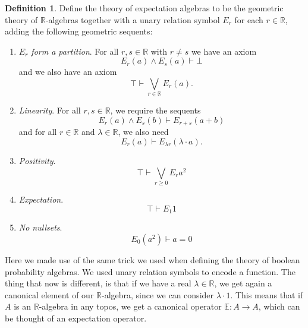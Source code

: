 \documentclass[a4paper]{amsproc}
\theoremstyle{plain}
\theoremstyle{definition}
\newtheorem{definition}[theorem]{Definition}
\theoremstyle{remark}
\numberwithin{equation}{section}
\newcommand{\Prob}{\mathfrak{Prob}}
\begin{document}
\begin{definition}
    Define the theory of expectation algebras to be the geometric theory of $\mathbb{R}$-algebras together with a unary relation symbol $E_r$ for each $r \in \mathbb{R}$, adding the following geometric sequents:
    \begin{enumerate}
        \item \textit{$E_r$ form a partition}. For all $r, s \in \mathbb{R}$ with $r \neq s$ we have an axiom
        \[
        E_r(a)  \wedge E_s(a) \vdash \bot
        \]
        and we also have an axiom
        \[
        \top \vdash \bigvee_{r \in \mathbb{R}} E_r(a).
        \]
        \item \textit{Linearity}. For all $r, s \in \mathbb{R}$, we require the sequents
        \[
        E_r(a) \wedge E_s(b) \vdash E_{r+s}(a + b)
        \]
        and for all $r \in \mathbb{R}$ and $\lambda \in \mathbb{R}$, we also need
        \[
        E_r(a) \vdash E_{\lambda r} (\lambda \cdot a) .
        \]
        \item \textit{Positivity}.
        \[
            \top \vdash \bigvee_{r \geq 0} E_r a^2
        \]
        \item \textit{Expectation}.
        \[
            \top \vdash E_1 1
        \]
        \item \textit{No nullsets}.
        \[
            E_0 (a^2) \vdash a = 0 %
        \]
    \end{enumerate}
\end{definition}

Here we made use of the same trick we used when defining the theory of boolean probability algebras. We used unary relation symbols to encode a function. The thing that now is different, is that if we have a real $\lambda \in \mathbb{R}$, we get again a canonical element of our $\mathbb{R}$-algebra, since we can consider $\lambda \cdot 1$. This means that if $A$ is an $\mathbb{R}$-algebra in any topos, we get a canonical operator $\mathbb{E}: A \to A$, which can be thought of an expectation operator.
\end{document}
